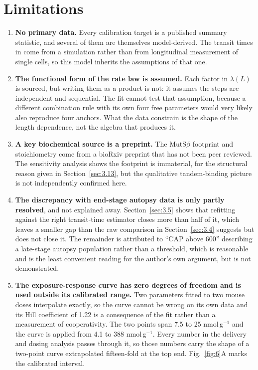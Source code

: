 \documentclass[conference]{IEEEtran}
\begin{document}
\section{Limitations}
\label{sec:5}
\begin{enumerate}
\item \textbf{No primary data.} Every calibration target is a published summary statistic, and several of them are themselves model-derived. The transit times in \cite{handsaker} come from a simulation rather than from longitudinal measurement of single cells, so this model inherits the assumptions of that one.
\item \textbf{The functional form of the rate law is assumed.} Each factor in $\lambda(L)$ is sourced, but writing them as a product is not: it assumes the steps are independent and sequential. The fit cannot test that assumption, because a different combination rule with its own four free parameters would very likely also reproduce four anchors. What the data constrain is the shape of the length dependence, not the algebra that produces it.
\item \textbf{A key biochemical source is a preprint.} The MutS$\beta$ footprint and stoichiometry \cite{tandem} come from a bioRxiv preprint that has not been peer reviewed. The sensitivity analysis shows the footprint is immaterial, for the structural reason given in Section~\ref{sec:3.13}, but the qualitative tandem-binding picture is not independently confirmed here.
\item \textbf{The discrepancy with end-stage autopsy data is only partly resolved}, and not explained away. Section~\ref{sec:3.5} shows that refitting against the right transit-time estimator closes more than half of it, which leaves a smaller gap than the raw comparison in Section~\ref{sec:3.4} suggests but does not close it. The remainder is attributed to ``CAP above 600'' describing a late-stage autopsy population rather than a threshold, which is reasonable and is the least convenient reading for the author's own argument, but is not demonstrated.
\item \textbf{The exposure-response curve has zero degrees of freedom and is used outside its calibrated range.} Two parameters fitted to two mouse doses interpolate exactly, so the curve cannot be wrong on its own data and its Hill coefficient of 1.22 is a consequence of the fit rather than a measurement of cooperativity. The two points span 7.5 to 25 nmol\,g$^{-1}$ and the curve is applied from 4.1 to 388 nmol\,g$^{-1}$. Every number in the delivery and dosing analysis passes through it, so those numbers carry the shape of a two-point curve extrapolated fifteen-fold at the top end. Fig.~\ref{fig:6}A marks the calibrated interval.

\end{enumerate}
\end{document}
